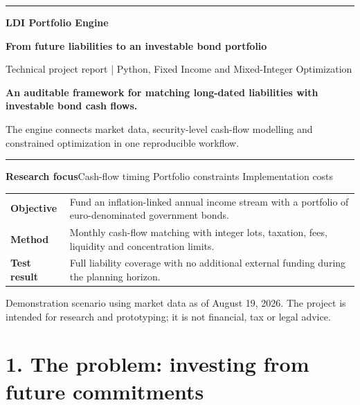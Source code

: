 \documentclass[10pt,a4paper]{article}
\newcommand{\sectionrule}{\par\vspace{1mm}\noindent\color{rulegray}\rule{\textwidth}{0.45pt}\par}
\begin{document}
\thispagestyle{empty}
\vspace*{4mm}
\noindent\color{accent}\rule{\textwidth}{2pt}\par
\vspace{8mm}
{\sffamily\fontsize{28}{32}\selectfont\bfseries LDI Portfolio Engine\par}
\vspace{3mm}
{\sffamily\Large\bfseries From future liabilities to an investable bond portfolio\par}
\vspace{6mm}
{\large Technical project report \;|\; Python, Fixed Income and Mixed-Integer Optimization\par}
\vspace{20mm}
{\sffamily\fontsize{18}{23}\selectfont\bfseries An auditable framework for matching long-dated liabilities with investable bond cash flows.\par}
\vspace{7mm}
{\large The engine connects market data, security-level cash-flow modelling and constrained optimization in one reproducible workflow.\par}
\vspace{10mm}
\sectionrule
\vspace{5mm}
{\small\textbf{Research focus}\hfill Cash-flow timing \;\textbullet\; Portfolio constraints \;\textbullet\; Implementation costs\par}
\vfill
\begin{tabularx}{\textwidth}{>{\bfseries}p{37mm}X}
Objective & Fund an inflation-linked annual income stream with a portfolio of euro-denominated government bonds.\\[2mm]
Method & Monthly cash-flow matching with integer lots, taxation, fees, liquidity and concentration limits.\\[2mm]
Test result & Full liability coverage with no additional external funding during the planning horizon.\\
\end{tabularx}
\vspace{5mm}
{\small Demonstration scenario using market data as of August 19, 2026. The project is intended for research and prototyping; it is not financial, tax or legal advice.\par}

\newpage
\section{1. The problem: investing from future commitments}
\end{document}
